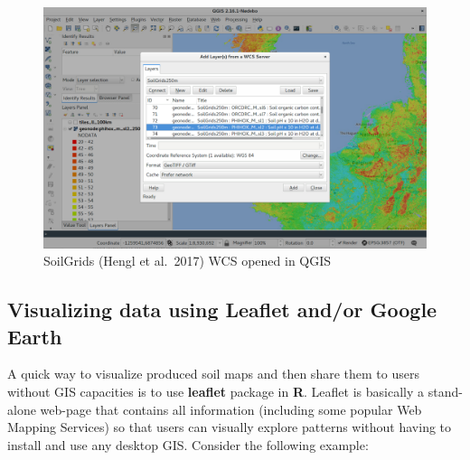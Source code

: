 \documentclass[10pt,b5paper,]{book}
\theoremstyle{definition}
\theoremstyle{definition}
\theoremstyle{definition}
\theoremstyle{remark}
\begin{document}
\begin{figure}
\centering
\includegraphics{images/Data_sharing_SoilGrids.png}
\caption{SoilGrids (Hengl et al.~2017) WCS opened in QGIS}
\end{figure}

\hypertarget{visualizing-data-using-leaflet-andor-google-earth}{%
\subsection{Visualizing data using Leaflet and/or Google
Earth}\label{visualizing-data-using-leaflet-andor-google-earth}}

A quick way to visualize produced soil maps and then share them to users
without GIS capacities is to use \textbf{leaflet} package in \textbf{R}.
Leaflet is basically a stand-alone web-page that contains all
information (including some popular Web Mapping Services) so that users
can visually explore patterns without having to install and use any
desktop GIS. Consider the following example:
\end{document}

